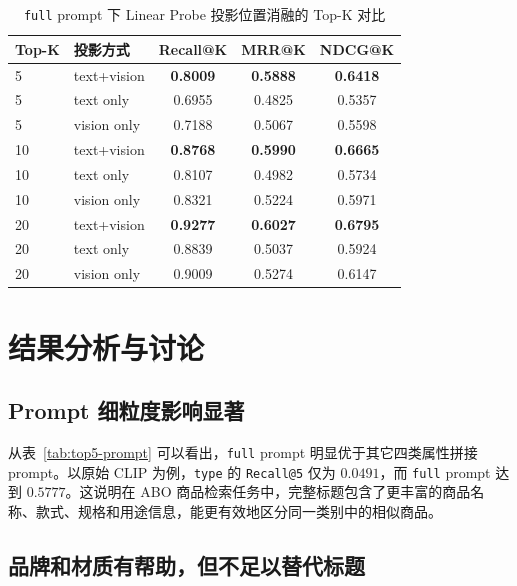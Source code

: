 \documentclass[11pt, a4paper]{ctexart}
\begin{document}
\begin{table}[!htbp]
    \centering
    \caption{\texttt{full} prompt 下 Linear Probe 投影位置消融的 Top-K 对比}
    \label{tab:linear-ablation-full-topk}
    \small
    \begin{tabular}{llccc}
        \toprule
        \textbf{Top-K} & \textbf{投影方式} & \textbf{Recall@K} & \textbf{MRR@K} & \textbf{NDCG@K} \\
        \midrule
        5 & text+vision & \textbf{0.8009} & \textbf{0.5888} & \textbf{0.6418} \\
        5 & text only & 0.6955 & 0.4825 & 0.5357 \\
        5 & vision only & 0.7188 & 0.5067 & 0.5598 \\
        \midrule
        10 & text+vision & \textbf{0.8768} & \textbf{0.5990} & \textbf{0.6665} \\
        10 & text only & 0.8107 & 0.4982 & 0.5734 \\
        10 & vision only & 0.8321 & 0.5224 & 0.5971 \\
        \midrule
        20 & text+vision & \textbf{0.9277} & \textbf{0.6027} & \textbf{0.6795} \\
        20 & text only & 0.8839 & 0.5037 & 0.5924 \\
        20 & vision only & 0.9009 & 0.5274 & 0.6147 \\
        \bottomrule
    \end{tabular}
\end{table}
\FloatBarrier

\section{结果分析与讨论}

\subsection{Prompt 细粒度影响显著}

从表~\ref{tab:top5-prompt} 可以看出，\texttt{full} prompt 明显优于其它四类属性拼接 prompt。以原始 CLIP 为例，\texttt{type} 的 \texttt{Recall@5} 仅为 $0.0491$，而 \texttt{full} prompt 达到 $0.5777$。这说明在 ABO 商品检索任务中，完整标题包含了更丰富的商品名称、款式、规格和用途信息，能更有效地区分同一类别中的相似商品。

\subsection{品牌和材质有帮助，但不足以替代标题}
\end{document}
